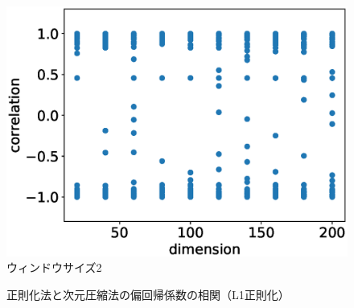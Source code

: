 
\begin{figure}[t]
  \centering
           \includegraphics[width=0.8\hsize]{img/lasso-correlation-2.eps} \\
           \small ウィンドウサイズ2
        \caption{正則化法と次元圧縮法の偏回帰係数の相関（L1正則化）}
    \label{soukan}
\end{figure}